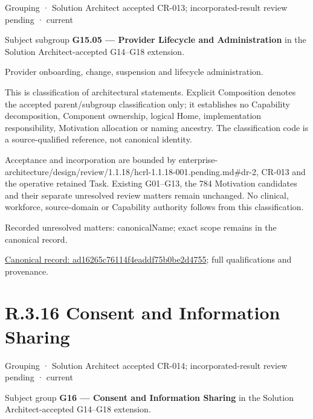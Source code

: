 \label{element:ad16265c76114f4eaddf75b0be2d4755}
{\small Grouping · Solution Architect accepted CR-013; incorporated-result review pending · current}\par

Subject subgroup \textbf{G15.05 — Provider Lifecycle and Administration} in the Solution Architect-accepted G14–G18 extension.



Provider onboarding, change, suspension and lifecycle administration.



This is classification of architectural statements. Explicit Composition denotes the accepted parent/subgroup classification only; it establishes no Capability decomposition, Component ownership, logical Home, implementation responsibility, Motivation allocation or naming ancestry. The classification code is a source-qualified reference, not canonical identity.



Acceptance and incorporation are bounded by enterprise-architecture/design/review/1.1.18/hcrl-1.1.18-001.pending.md\#dr-2, CR-013 and the operative retained Task. Existing G01–G13, the 784 Motivation candidates and their separate unresolved review matters remain unchanged. No clinical, workforce, source-domain or Capability authority follows from this classification.


{\small Recorded unresolved matters: canonicalName; exact scope remains in the canonical record.}\par
{\footnotesize \href{../../../../continuum/grouping/ad16265c76114f4eaddf75b0be2d4755.md}{Canonical record: ad16265c76114f4eaddf75b0be2d4755}; full qualifications and provenance.}\par
\section*{R.3.16 Consent and Information Sharing}
\label{navigation:R.3.16}

\label{element:abca473311ea40aca58756d859077ff7}
{\small Grouping · Solution Architect accepted CR-014; incorporated-result review pending · current}\par

Subject group \textbf{G16 — Consent and Information Sharing} in the Solution Architect-accepted G14–G18 extension.



